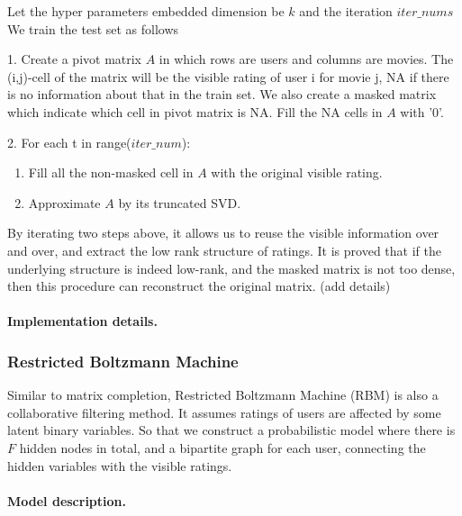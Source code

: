 \documentclass[bj, preprint]{imsart}
\begin{document}
Let the hyper parameters embedded dimension be $k$ and the iteration $iter\_nums$ We train the test set as follows

1. Create a pivot matrix $A$ in which rows are users and columns are movies. The (i,j)-cell of the matrix will be the visible rating of user i for movie j, NA if there is no information about that in the train set. We also create a masked matrix which indicate which cell in pivot matrix is NA. Fill the NA cells in $A$ with '0'.

2. For each t in range($iter\_num$): 
\begin{enumerate}
	\item Fill all the non-masked cell in $A$ with the original visible rating.
	\item Approximate $A$ by its truncated SVD. 
\end{enumerate}
By iterating two steps above, it allows us to reuse the visible information over and over, and extract the low rank structure of ratings. It is proved that if the underlying structure is indeed low-rank, and the masked matrix is not too dense, then this procedure can reconstruct the original matrix. (add details)

\paragraph{Implementation details.}\label{par:method.models.svd.impl}

\subsubsection{Restricted Boltzmann Machine}\label{subsubsec:method.models.rbm}
Similar to matrix completion, Restricted Boltzmann Machine (RBM) is also a collaborative filtering method. It assumes ratings of users are affected by some latent binary variables. So that we construct a probabilistic model where there is $F$ hidden nodes in total, and a bipartite graph for each user, connecting the hidden variables with the visible ratings. 

\paragraph{Model description.}\label{par:method.models.rbm.model}
\end{document}
